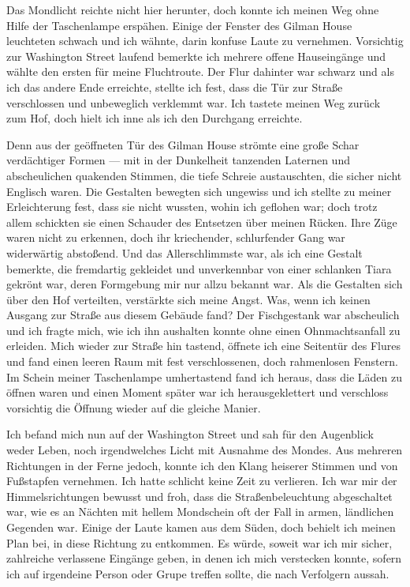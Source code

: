 Das Mondlicht reichte nicht hier herunter, doch konnte ich meinen Weg ohne Hilfe der Taschenlampe erspähen. Einige der Fenster des Gilman House leuchteten schwach und ich wähnte, darin konfuse Laute zu vernehmen. Vorsichtig zur Washington Street laufend bemerkte ich mehrere offene Hauseingänge und wählte den ersten für meine Fluchtroute. Der Flur dahinter war schwarz und als ich das andere Ende erreichte, stellte ich fest, dass die Tür zur Straße verschlossen und unbeweglich verklemmt war. Ich tastete meinen Weg zurück zum Hof, doch hielt ich inne als ich den Durchgang erreichte.

Denn aus der geöffneten Tür des Gilman House strömte eine große Schar verdächtiger Formen --- mit in der Dunkelheit tanzenden Laternen und abscheulichen quakenden Stimmen, die tiefe Schreie austauschten, die sicher nicht Englisch waren. Die Gestalten bewegten sich ungewiss und ich stellte zu meiner Erleichterung fest, dass sie nicht wussten, wohin ich geflohen war; doch trotz allem schickten sie einen Schauder des Entsetzen über meinen Rücken. Ihre Züge waren nicht zu erkennen, doch ihr kriechender, schlurfender Gang war widerwärtig abstoßend. Und das Allerschlimmste war, als ich eine Gestalt bemerkte, die fremdartig gekleidet und unverkennbar von einer schlanken Tiara gekrönt war, deren Formgebung mir nur allzu bekannt war. Als die Gestalten sich über den Hof verteilten, verstärkte sich meine Angst. Was, wenn ich keinen Ausgang zur Straße aus diesem Gebäude fand? Der Fischgestank war abscheulich und ich fragte mich, wie ich ihn aushalten konnte ohne einen Ohnmachtsanfall zu erleiden. Mich wieder zur Straße hin tastend, öffnete ich eine Seitentür des Flures und fand einen leeren Raum mit fest verschlossenen, doch rahmenlosen Fenstern. Im Schein meiner Taschenlampe umhertastend fand ich heraus, dass die Läden zu öffnen waren und einen Moment später war ich herausgeklettert und verschloss vorsichtig die Öffnung wieder auf die gleiche Manier.

Ich befand mich nun auf der Washington Street und sah für den Augenblick weder Leben, noch irgendwelches Licht mit Ausnahme des Mondes. Aus mehreren Richtungen in der Ferne jedoch, konnte ich den Klang heiserer Stimmen und von Fußstapfen vernehmen. Ich hatte schlicht keine Zeit zu verlieren. Ich war mir der Himmelsrichtungen bewusst und froh, dass die Straßenbeleuchtung abgeschaltet war, wie es an Nächten mit hellem Mondschein oft der Fall in armen, ländlichen Gegenden war. Einige der Laute kamen aus dem Süden, doch behielt ich meinen Plan bei, in diese Richtung zu entkommen. Es würde, soweit war ich mir sicher, zahlreiche verlassene Eingänge geben, in denen ich mich verstecken konnte, sofern ich auf irgendeine Person oder Grupe treffen sollte, die nach Verfolgern aussah.

